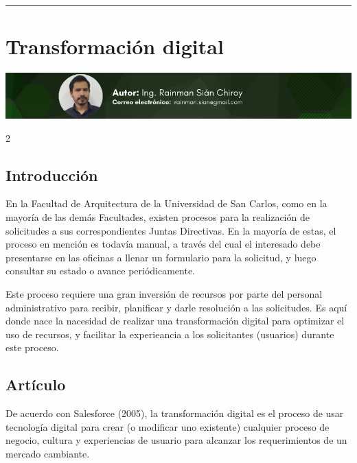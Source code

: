 \documentclass[12pt,spanish,Letterpaper,openany]{book}
\newcommand{\HRule}{\begin{center}\rule{0.5\linewidth}{0.2mm}\end{center}}
\begin{document}
\medskip

\HRule

\medskip

\hypertarget{article04}{%
\chapter{Transformación digital}\label{article04}}

\begin{center}\includegraphics[width=1\linewidth]{images/rainman} \end{center}

\begin {multicols}{2}

\hypertarget{introducciuxf3n-4}{%
\section{Introducción}\label{introducciuxf3n-4}}

En la Facultad de Arquitectura de la Universidad de San Carlos, como en la mayoría de las demás Facultades, existen procesos para la realización de solicitudes a sus correspondientes Juntas Directivas. En la mayoría de estas, el proceso en mención es todavía manual, a través del cual el interesado debe presentarse en las oficinas a llenar un formulario para la solicitud, y luego consultar su estado o avance periódicamente.

Este proceso requiere una gran inversión de recursos por parte del personal administrativo para recibir, planificar y darle resolución a las solicitudes. Es aquí donde nace la nacesidad de realizar una transformación digital para optimizar el uso de recursos, y facilitar la experieancia a los solicitantes (usuarios) durante este proceso.

\hypertarget{artuxedculo-3}{%
\section{Artículo}\label{artuxedculo-3}}

De acuerdo con Salesforce (2005), la transformación digital es el proceso de usar tecnología digital para crear (o modificar uno existente) cualquier proceso de negocio, cultura y experiencias de usuario para alcanzar los requerimientos de un mercado cambiante.


\end{multicols}
\end{document}
